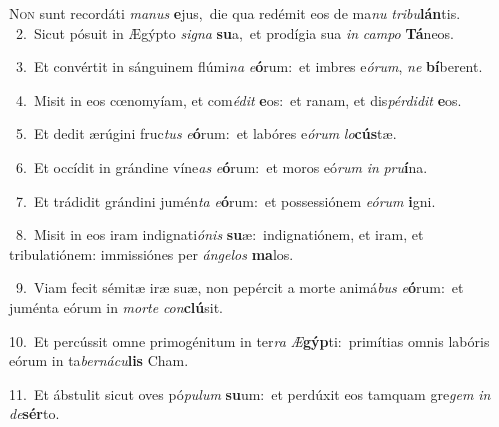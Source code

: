 \lettrine{\initial\textcolor{\initialcolor}{N}}{on} sunt recordáti \textit{ma}\-\textit{nus} \textbf{e}\-jus,~\star die qua redémit eos de ma\textit{nu} \textit{tri}\-\textit{bu}\textbf{lán}tis.\\
{\numbfont\textcolor{\numbcolor}{~2.}}~Sicut pósuit in Ægýpto \textit{si}\-\textit{gna} \textbf{su}\-a,~\star et prodígia sua \textit{in} \textit{cam}\-\textit{po} \textbf{Tá}\-neos.\par
{\numbfont\textcolor{\numbcolor}{~3.}}~Et convértit in sánguinem flúmi\textit{na} \textit{e}\-\textbf{ó}rum:~\star et imbres e\-\textit{ó}\-\textit{rum}, \textit{ne} \textbf{bí}\-berent.\par
{\numbfont\textcolor{\numbcolor}{~4.}}~Misit in eos cœnomyíam, et com\-\textit{é}\-\textit{dit} \textbf{e}\-os:~\star et ranam, et dis\-\textit{pér}\-\textit{di}\textit{dit} \textbf{e}\-os.\par
{\numbfont\textcolor{\numbcolor}{~5.}}~Et dedit ærúgini fruc\textit{tus} \textit{e}\-\textbf{ó}rum:~\star et labóres e\-\textit{ó}\-\textit{rum} \textit{lo}\-\textbf{cús}tæ.\par
{\numbfont\textcolor{\numbcolor}{~6.}}~Et occídit in grándine víne\textit{as} \textit{e}\-\textbf{ó}rum:~\star et moros eó\textit{rum} \textit{in} \textit{pru}\-\textbf{í}na.\par
{\numbfont\textcolor{\numbcolor}{~7.}}~Et trádidit grándini jumén\textit{ta} \textit{e}\-\textbf{ó}rum:~\star et possessiónem \textit{e}\-\textit{ó}\textit{rum} \textbf{i}\-gni.\par
{\numbfont\textcolor{\numbcolor}{~8.}}~Misit in eos iram indignati\-\textit{ó}\-\textit{nis} \textbf{su}\-æ:~\star indignatiónem, et iram, et tribulatiónem: immissiónes per \textit{án}\-\textit{ge}\textit{los} \textbf{ma}\-los.\par
{\numbfont\textcolor{\numbcolor}{~9.}}~Viam fecit sémitæ iræ suæ, non pepércit a morte animá\textit{bus} \textit{e}\-\textbf{ó}rum:~\star et juménta eórum in \textit{mor}\-\textit{te} \textit{con}\-\textbf{clú}sit.\par
{\numbfont\textcolor{\numbcolor}{10.}}~Et percússit omne primogénitum in ter\textit{ra} \textit{Æ}\-\textbf{gýp}ti:~\star primítias omnis labóris eórum in ta\-\textit{ber}\-\textit{ná}\textit{cu}\textbf{lis} Cham.\par
{\numbfont\textcolor{\numbcolor}{11.}}~Et ábstulit sicut oves pó\-\textit{pu}\-\textit{lum} \textbf{su}\-um:~\star et perdúxit eos tamquam gre\textit{gem} \textit{in} \textit{de}\-\textbf{sér}to.\par
